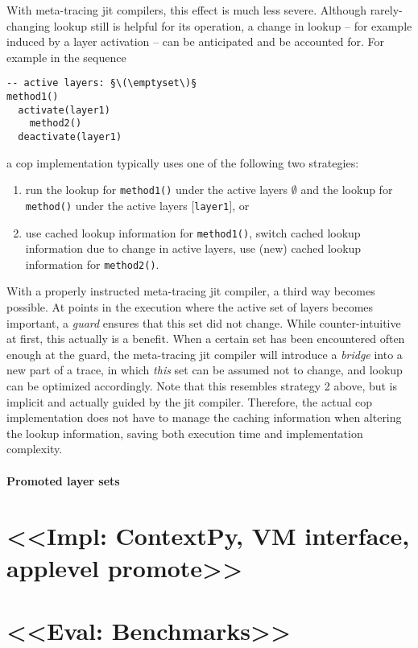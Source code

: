 \documentclass[preprint,english,10pt,nonatbib]{sigplanconf}
\begin{document}
With meta-tracing \ac{jit} compilers, this effect is much less severe. Although
rarely-changing lookup still is helpful for its operation, a change in lookup
\--- for example induced by a layer activation \--- can be anticipated and be
accounted for. For example in the sequence
\begin{lstlisting}
-- active layers: §\(\emptyset\)§
method1()
  activate(layer1)
    method2()
  deactivate(layer1)
\end{lstlisting}
a \ac{cop} implementation typically uses one of the following two strategies:
\begin{enumerate}
\item run the lookup for \lstinline|method1()| under the active layers
  \(\emptyset\) and the lookup for \lstinline|method()| under the active layers
  \([\)\lstinline|layer1|\(]\), or
\item use cached lookup information for \lstinline|method1()|, switch cached
  lookup information due to change in active layers, use (new) cached lookup
  information for \lstinline|method2()|.
\end{enumerate}
With a properly instructed meta-tracing \ac{jit} compiler, a third way becomes
possible. At points in the execution where the active set of layers becomes
important, a \emph{guard} ensures that this set did not change. While
counter-intuitive at first, this actually is a benefit. When a certain set has
been encountered often enough at the guard, the meta-tracing \ac{jit} compiler
will introduce a \emph{bridge} into a new part of a trace, in which \emph{this}
set can be assumed not to change, and lookup can be optimized accordingly. Note
that this resembles strategy 2 above, but is implicit and actually guided by
the \ac{jit} compiler. Therefore, the actual \ac{cop} implementation does not
have to manage the caching information when altering the lookup information,
saving both execution time and implementation complexity.

\paragraph{Promoted layer sets} 




\section{<<Impl: ContextPy, VM interface, applevel promote>>}


\section{<<Eval: Benchmarks>>}
\end{document}
